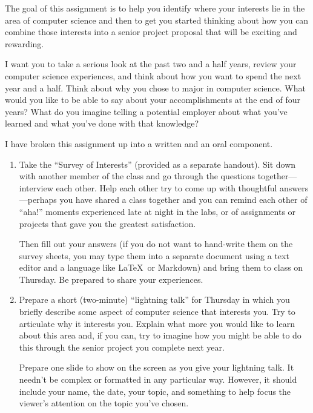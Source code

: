 



The goal of this assignment is to help you identify where your interests lie
in the area of computer science and then to get you started thinking about
how you can combine those interests into a senior project proposal that
will be exciting and rewarding.

I want you to take a serious look at the past two and a half years,
review your computer science experiences, and think about how you want
to spend the next year and a half.  Think about why you chose to major
in computer science. What would you like to be able to say about your
accomplishments at the end of four years? What do you imagine telling a
potential employer about what you've learned and what you've done with
that knowledge?

I have broken this assignment up into a written and an oral component.

\begin{enumerate}

\item Take the ``Survey of Interests'' (provided as a separate handout). Sit down with another member of the class and
  go through the questions together---interview each other. Help each other try to come up with thoughtful
  answers---perhaps you have shared a class together and you can remind each other of ``aha!'' moments experienced late
  at night in the labs, or of assignments or projects that gave you the greatest satisfaction.

Then fill out your answers (if you do not want to hand-write them on the survey sheets, you may type them into a
separate document using a text editor and a language like \LaTeX\ or Markdown) and bring them to class on Thursday. Be
prepared to share your experiences.

\item
Prepare a short (two-minute) ``lightning talk'' for Thursday in 
which you briefly
describe some aspect of computer science that interests you. Try to 
articulate why it interests you. Explain what more
you would like to learn about this area and, if you can, try
to imagine how you might be able to do this through the senior project you complete next year.


Prepare one slide to show on the screen as you give your lightning talk. It 
needn't be complex or formatted in any particular way. However, it should
include your name, the date, your topic, and something to help focus the
viewer's attention on the topic you've chosen.
\end{enumerate}


